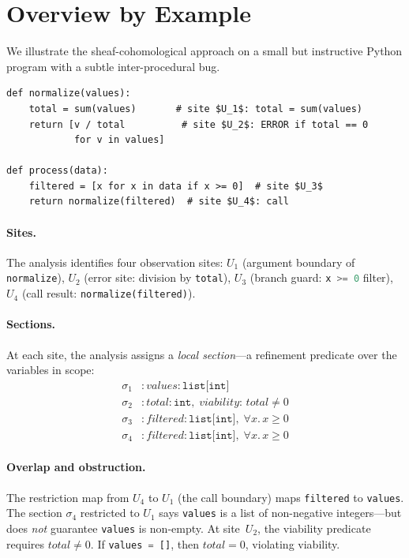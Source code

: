 \documentclass[acmsmall,screen]{acmart}
\theoremstyle{remark}
\newcommand{\py}[1]{\lstinline[language=Python]{#1}}
\begin{document}
\section{Overview by Example}\label{sec:overview}

We illustrate the sheaf-cohomological approach on a small but
instructive Python program with a subtle inter-procedural bug.

\begin{lstlisting}
def normalize(values):
    total = sum(values)       # site $U_1$: total = sum(values)
    return [v / total          # site $U_2$: ERROR if total == 0
            for v in values]

def process(data):
    filtered = [x for x in data if x >= 0]  # site $U_3$
    return normalize(filtered)  # site $U_4$: call
\end{lstlisting}

\paragraph{Sites.}
The analysis identifies four observation sites:
$U_1$ (argument boundary of \py{normalize}),
$U_2$ (error site: division by \py{total}),
$U_3$ (branch guard: \py{x >= 0} filter),
$U_4$ (call result: \py{normalize(filtered)}).

\paragraph{Sections.}
At each site, the analysis assigns a \emph{local section}---a
refinement predicate over the variables in scope:
\begin{align*}
  \sigma_1 &: \mathit{values} : \texttt{list[int]} \\
  \sigma_2 &: \mathit{total} : \texttt{int},\; \textit{viability: } \mathit{total} \neq 0 \\
  \sigma_3 &: \mathit{filtered} : \texttt{list[int]},\; \forall x.\, x \geq 0 \\
  \sigma_4 &: \mathit{filtered} : \texttt{list[int]},\; \forall x.\, x \geq 0
\end{align*}

\paragraph{Overlap and obstruction.}
The restriction map from $U_4$ to $U_1$ (the call boundary) maps
\py{filtered} to \py{values}.  The section $\sigma_4$ restricted to
$U_1$ says \py{values} is a list of non-negative integers---but does
\emph{not} guarantee \py{values} is non-empty.  At site~$U_2$, the
viability predicate requires $\mathit{total} \neq 0$.  If
\py{values = []}, then $\mathit{total} = 0$, violating viability.
\end{document}
